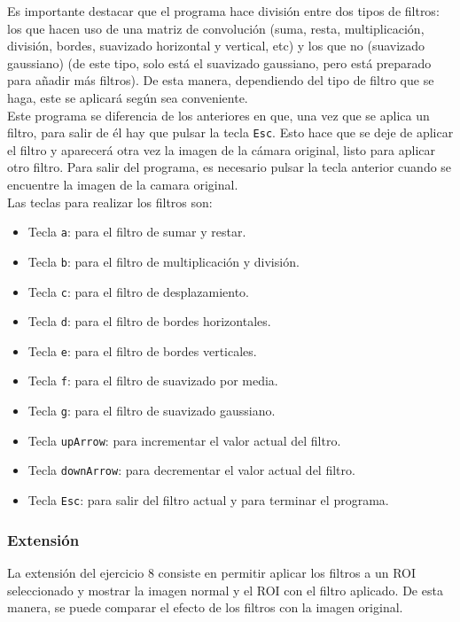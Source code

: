 \documentclass[a4paper,10pt,titlepage,oneside,openright]{book}
\begin{document}
Es importante destacar que el programa hace división entre dos tipos de filtros: los que hacen uso de una matriz de convolución (suma, resta, multiplicación, división, bordes, suavizado horizontal y vertical, etc) y los que no (suavizado gaussiano) (de este tipo, solo está el suavizado gaussiano, pero está preparado para añadir más filtros). De esta manera, dependiendo del tipo de filtro que se haga, este se aplicará según sea conveniente. \\

Este programa se diferencia de los anteriores en que, una vez que se aplica un filtro, para salir de él hay que pulsar la tecla \texttt{Esc}. Esto hace que se deje de aplicar el filtro y aparecerá otra vez la imagen de la cámara original, listo para aplicar otro filtro. Para salir del programa, es necesario pulsar la tecla anterior cuando se encuentre la imagen de la camara original. \\

Las teclas para realizar los filtros son:
\begin{itemize}
 \item Tecla \texttt{a}: para el filtro de sumar y restar.
 \item Tecla \texttt{b}: para el filtro de multiplicación y división.
 \item Tecla \texttt{c}: para el filtro de desplazamiento.
 \item Tecla \texttt{d}: para el filtro de bordes horizontales.
 \item Tecla \texttt{e}: para el filtro de bordes verticales.
 \item Tecla \texttt{f}: para el filtro de suavizado por media.
 \item Tecla \texttt{g}: para el filtro de suavizado gaussiano.
 \item Tecla \texttt{upArrow}: para incrementar el valor actual del filtro.
 \item Tecla \texttt{downArrow}: para decrementar el valor actual del filtro.
 \item Tecla \texttt{Esc}: para salir del filtro actual y para terminar el programa.
\end{itemize}



\medskip
\subsubsection{Extensión}
La extensión del ejercicio 8 consiste en permitir aplicar los filtros a un ROI seleccionado y mostrar la imagen normal y el ROI con el filtro aplicado. De esta manera, se puede comparar el efecto de los filtros con la imagen original.
\end{document}
